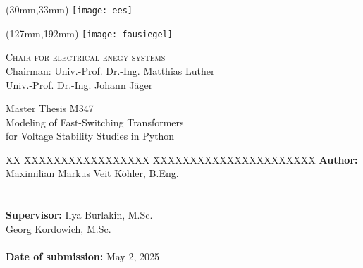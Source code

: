 \thispagestyle{empty}
\setcounter{page}{-1}

\begin{textblock*}{\textwidth}(30mm,33mm)
\texttt{[image: ees]}
\end{textblock*}

\begin{textblock*}{\textwidth}(127mm,192mm)
\texttt{[image: fausiegel]}
\end{textblock*}

{\raggedleft
\textsc{Chair for electrical enegy systems}\\
Chairman: Univ.-Prof. Dr.-Ing. Matthias Luther \\
Univ.-Prof. Dr.-Ing. Johann Jäger
\par}

\vspace{51mm}

{\centering

\large{Master Thesis M347} \\	
\Large{Modeling of Fast-Switching Transformers\\for Voltage Stability Studies in Python}

\par}

\vfill

{\raggedright
\begin{tabbing}
XX \= XXXXXXXXXXXXXXXXX \= XXXXXXXXXXXXXXXXXXXXXX \kill
		\> \textbf{Author:} 	\> Maximilian Markus Veit Köhler, B.Eng. \\
		\>								\\
 		\>												\>									\\
		\> \textbf{Supervisor:}		\> Ilya Burlakin, M.Sc. \\
		\> 							\> Georg Kordowich, M.Sc. \\
		\>												\>									\\
		\> \textbf{Date of submission:}	\> May 2, 2025															
\end{tabbing}
\par}
\cleardoublepage